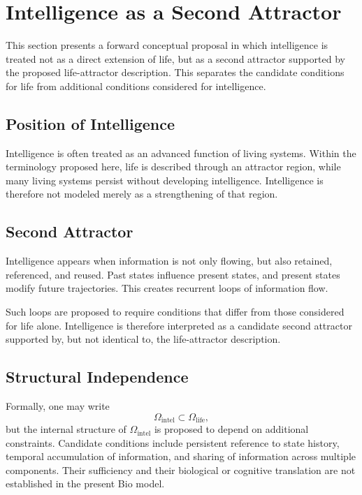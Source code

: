\section{Intelligence as a Second Attractor}

This section presents a forward conceptual proposal in which intelligence is treated not as a direct extension of life, but as a second attractor supported by the proposed life-attractor description. This separates the candidate conditions for life from additional conditions considered for intelligence.

\subsection{Position of Intelligence}

Intelligence is often treated as an advanced function of living systems. Within the terminology proposed here, life is described through an attractor region, while many living systems persist without developing intelligence. Intelligence is therefore not modeled merely as a strengthening of that region.

\subsection{Second Attractor}

Intelligence appears when information is not only flowing, but also retained, referenced, and reused. Past states influence present states, and present states modify future trajectories. This creates recurrent loops of information flow.

Such loops are proposed to require conditions that differ from those considered for life alone. Intelligence is therefore interpreted as a candidate second attractor supported by, but not identical to, the life-attractor description.

\subsection{Structural Independence}

Formally, one may write
\begin{equation}
  \Omega_{\mathrm{intel}} \subset \Omega_{\mathrm{life}},
\end{equation}
but the internal structure of \(\Omega_{\mathrm{intel}}\) is proposed to depend on additional constraints. Candidate conditions include persistent reference to state history, temporal accumulation of information, and sharing of information across multiple components. Their sufficiency and their biological or cognitive translation are not established in the present Bio model.


